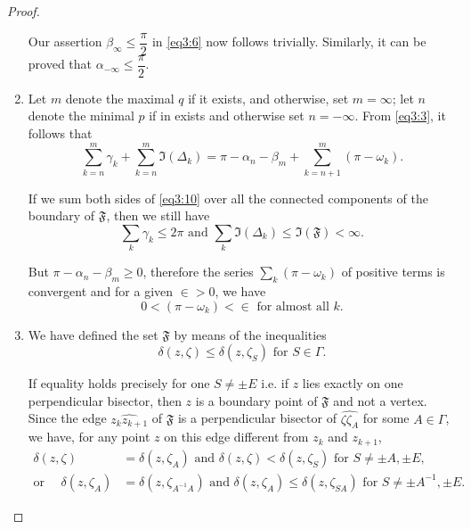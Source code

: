 \begin{proof}
\begin{enumerate}
Our assertion $\beta_{\infty} \leq \dfrac{\pi}{2}$ in \eqref{eq3:6} now follows
trivially. Similarly, it can be proved that $\alpha_{-\infty} \leq
\dfrac{\pi}{2}$. 

\item Let $m$ denote the maximal $q$ if it exists, and otherwise, set
  $m=\infty$; let $n$ denote the minimal $p$ if in exists and
  otherwise set $n=-\infty$. From \eqref{eq3:3}, it follows that 
\begin{equation*}
\sum^m_{k=n} \gamma_k + \sum^m_{k=n} \mathfrak{I} (\Delta_k) = \pi -
\alpha_n -\beta_{m} + \sum^m_{k=n+1} (\pi-\omega_k). \tag{10}\label{eq3:10}
\end{equation*}

If we sum both sides of \eqref{eq3:10} over all the connected components of the
boundary of $\mathfrak{F}$, then we still have
\begin{equation*}
\sum_k \gamma_k \leq 2\pi \text{ and } \sum_k \mathfrak{I} (\Delta_k)
\leq \mathfrak{I} (\mathfrak{F}) < \infty. \tag{11}\label{eq3:11}
\end{equation*}

But $\pi - \alpha_n - \beta_m \geq 0$, therefore the series $\sum_k
(\pi-\omega_k)$ of positive terms is convergent and for a given
$\in >0$, we have
\begin{equation*}
0 < (\pi-\omega_k) < \in \text{ for almost all } k. \tag{12}\label{eq3:12}
\end{equation*}

\item We have defined the set $\mathfrak{F}$ by means of the
  inequalities 
$$
\delta(z, \zeta) \leq \delta (z,\zeta_S) \text{ for } S \in
\Gamma. 
$$

If equality holds precisely for one $S \neq \pm E$ i.e. if $z$ lies
exactly on one perpendicular bisector, then $z$ is a boundary point of
$\mathfrak{F}$ and not a vertex. \pageoriginale Since the edge
$\widehat{z_k z_{k+1}}$ of $\mathfrak{F}$ is a perpendicular bisector
of $\widehat{\zeta \zeta_{A}}$ for some $A \in \Gamma$, we
have, for any point $z$ on this edge different from $z_k$ and $z_{k+1}$,
\begin{align*}
 \delta (z,\zeta) & = \delta (z,\zeta_A) \text{ and } \delta(z,\zeta) <
\delta (z,\zeta_S) \text{ for } S \neq \pm A, \pm E,\\
\text{or } \quad 
 \delta (z,\zeta_A) & = \delta
(z,\zeta_{A^{-1}A} ) \text{ and } \delta (z,\zeta_A) \leq \delta
(z,\zeta_{SA}) \text{ for } S \neq \pm A^{-1}, \pm E. 
\end{align*}


\end{enumerate}
\end{proof}

